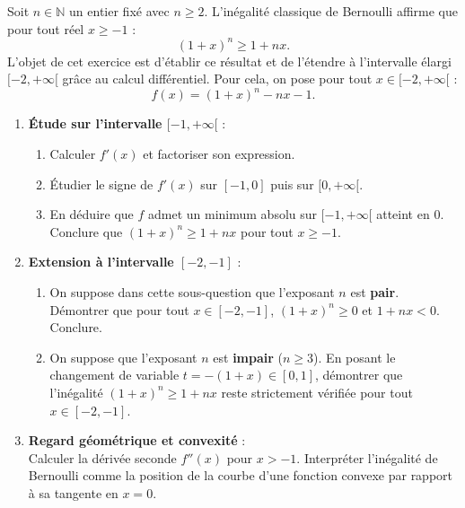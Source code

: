 \documentclass[11pt,a4paper]{article}
\newcommand{\N}{\mathbb{N}}
\begin{document}
Soit $n \in \N$ un entier fixé avec $n \ge 2$. L'inégalité classique de Bernoulli affirme que pour tout réel $x \ge -1$ :
\[
(1+x)^n \ge 1 + nx.
\]
L'objet de cet exercice est d'établir ce résultat et de l'étendre à l'intervalle élargi $[-2, +\infty[$ grâce au calcul différentiel.
Pour cela, on pose pour tout $x \in [-2, +\infty[$ :
\[
f(x) = (1+x)^n - nx - 1.
\]
\begin{enumerate}[label=\textbf{\arabic*.}]
    \item \textbf{Étude sur l'intervalle $[-1, +\infty[$} :
    \begin{enumerate}[label=\alph*.]
        \item Calculer $f'(x)$ et factoriser son expression.
        \item Étudier le signe de $f'(x)$ sur $[-1, 0]$ puis sur $[0, +\infty[$.
        \item En déduire que $f$ admet un minimum absolu sur $[-1, +\infty[$ atteint en $0$. Conclure que $(1+x)^n \ge 1+nx$ pour tout $x \ge -1$.
    \end{enumerate}

    \item \textbf{Extension à l'intervalle $[-2, -1]$} :
    \begin{enumerate}[label=\alph*.]
        \item On suppose dans cette sous-question que l'exposant $n$ est \textbf{pair}. Démontrer que pour tout $x \in [-2, -1]$, $(1+x)^n \ge 0$ et $1+nx < 0$. Conclure.
        \item On suppose que l'exposant $n$ est \textbf{impair} ($n \ge 3$). En posant le changement de variable $t = -(1+x) \in [0, 1]$, démontrer que l'inégalité $(1+x)^n \ge 1+nx$ reste strictement vérifiée pour tout $x \in [-2, -1]$.
    \end{enumerate}

    \item \textbf{Regard géométrique et convexité} :\\
    Calculer la dérivée seconde $f''(x)$ pour $x > -1$. Interpréter l'inégalité de Bernoulli comme la position de la courbe d'une fonction convexe par rapport à sa tangente en $x = 0$.
\end{enumerate}
\end{document}
